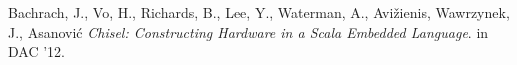 \documentclass[10pt,twocolumn]{article}
\def\note#1{\noindent{\bf [Note: #1]}}
\begin{document}
% 
% 
% 
\begin{thebibliography}{50}
 Bachrach, J., Vo, H., Richards, B., Lee, Y., Waterman,
  A., Avi\v{z}ienis, Wawrzynek, J., Asanovi\'{c} \textsl{Chisel:
    Constructing Hardware in a Scala Embedded Language}.
in DAC '12.
\end{thebibliography}
 
\end{document}
